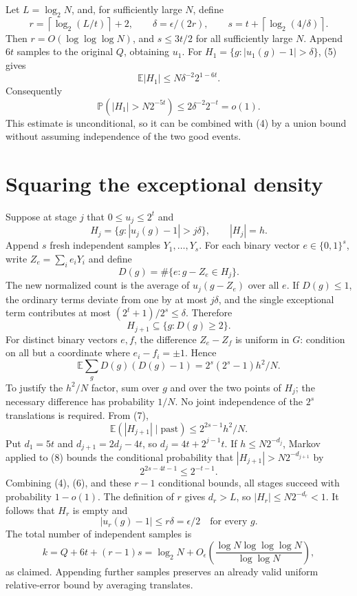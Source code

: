 \documentclass[11pt]{article}
\begin{document}
Let $L=\log_2N$, and, for sufficiently large $N$, define
\[
 r=\left\lceil\log_2(L/t)\right\rceil+2,
 \qquad\delta=\epsilon/(2r),
 \qquad s=t+\left\lceil\log_2(4/\delta)\right\rceil.
\]
Then $r=O(\log\log\log N)$, and $s\le3t/2$ for all sufficiently large $N$. Append $6t$ samples to the original $Q$, obtaining $u_1$. For
$H_1=\{g:|u_1(g)-1|>\delta\}$, (5) gives
\[
 \mathbb E|H_1|\le N\delta^{-2}2^{1-6t}.
\]
Consequently
\[
 \mathbb P(|H_1|>N2^{-5t})\le2\delta^{-2}2^{-t}=o(1).\tag{6}
\]
This estimate is unconditional, so it can be combined with (4) by a union bound without assuming independence of the two good events.

\section*{Squaring the exceptional density}
Suppose at stage $j$ that $0\le u_j\le2^t$ and
\[
 H_j=\{g:|u_j(g)-1|>j\delta\},\qquad |H_j|=h.
\]
Append $s$ fresh independent samples $Y_1,\ldots,Y_s$. For each binary vector $e\in\{0,1\}^s$, write $Z_e=\sum_i e_iY_i$ and define
\[
 D(g)=\#\{e:g-Z_e\in H_j\}.
\]
The new normalized count is the average of $u_j(g-Z_e)$ over all $e$. If $D(g)\le1$, the ordinary terms deviate from one by at most $j\delta$, and the single exceptional term contributes at most $(2^t+1)/2^s\le\delta$. Therefore
\[
 H_{j+1}\subseteq\{g:D(g)\ge2\}.\tag{7}
\]
For distinct binary vectors $e,f$, the difference $Z_e-Z_f$ is uniform in $G$: condition on all but a coordinate where $e_i-f_i=\pm1$. Hence
\[
 \mathbb E\sum_g D(g)(D(g)-1)=2^s(2^s-1)h^2/N.
\]
To justify the $h^2/N$ factor, sum over $g$ and over the two points of $H_j$; the necessary difference has probability $1/N$. No joint independence of the $2^s$ translations is required. From (7),
\[
 \mathbb E(|H_{j+1}|\mid\text{past})\le2^{2s-1}h^2/N.\tag{8}
\]
Put $d_1=5t$ and $d_{j+1}=2d_j-4t$, so $d_j=4t+2^{j-1}t$. If $h\le N2^{-d_j}$, Markov applied to (8) bounds the conditional probability that $|H_{j+1}|>N2^{-d_{j+1}}$ by
\[
 2^{2s-4t-1}\le2^{-t-1}.
\]
Combining (4), (6), and these $r-1$ conditional bounds, all stages succeed with probability $1-o(1)$. The definition of $r$ gives $d_r>L$, so $|H_r|\le N2^{-d_r}<1$. It follows that $H_r$ is empty and
\[
 |u_r(g)-1|\le r\delta=\epsilon/2\quad\text{for every }g.
\]
The total number of independent samples is
\[
 k=Q+6t+(r-1)s
 =\log_2N+O_\epsilon\left(\frac{\log N\log\log\log N}{\log\log N}\right),
\]
as claimed. Appending further samples preserves an already valid uniform relative-error bound by averaging translates.
\end{document}
